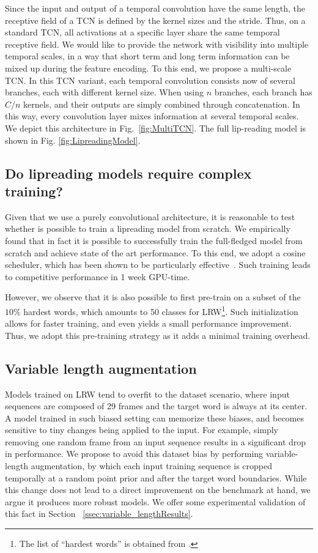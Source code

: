 \documentclass{article}
\begin{document}
Since the input and output of a temporal convolution have the same length, the receptive field of a TCN is defined by the kernel sizes and the stride. Thus, on a standard TCN, all activations at a specific layer share the same temporal receptive field. We would like to provide the network with visibility into multiple temporal scales, in a way that short term and long term information can be mixed up during the feature encoding. To this end, we propose a multi-scale TCN. In this TCN variant, each temporal convolution consists now of several branches, each with different kernel size. When using $n$ branches, each branch has $C/n$ kernels, and their outputs are simply combined through concatenation. In this way, every convolution layer mixes information at several temporal scales. We depict this architecture in Fig.~\ref{fig:MultiTCN}. The full lip-reading model is shown in Fig. \ref{fig:LipreadingModel}.



\subsection{Do lipreading models require complex training?}

Given that we use a purely convolutional architecture, it is reasonable to test whether is possible to train a lipreading model from scratch. We empirically found that in fact it is possible to successfully train the full-fledged model from scratch and achieve state of the art performance. To this end, we adopt a cosine scheduler, which has been shown to be particularly effective~\cite{sgdr17}. Such training leads to competitive performance in 1 week GPU-time.

However, we observe that it is also possible to first pre-train on a subset of the $10\%$ hardest words, which amounts to 50 classes for LRW\footnote{The list of ``hardest words'' is obtained from \cite{stafylakis17}.}. Such initialization allows for faster training, and even yields a small performance improvement. Thus, we adopt this pre-training strategy as it adds a minimal training overhead. 


\subsection{Variable length augmentation} 
\label{ssec:varLenAugm}

Models trained on LRW tend to overfit to the dataset scenario, where input sequences are composed of 29 frames and the target word is always at its center. A model trained in such biased setting can memorize these biases, and becomes sensitive to tiny changes being applied to the input. For example, simply removing one random frame from an input sequence results in a significant drop in performance. We propose to avoid this dataset bias by performing variable-length augmentation, by which each input training sequence is cropped temporally at a random point prior and after the target word boundaries. While this change does not lead to a direct improvement on the benchmark at hand, we argue it produces more robust models. We offer some experimental validation of this fact in Section ~\ref{ssec:variable_lengthResults}.
\end{document}
